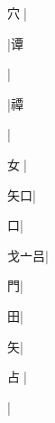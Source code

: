 \begin{multicols}{2}
{{\cjk{}{\cnsym{}　}穴{\cnxJzr{}}}\mktsJzrVerticalBar{}{\cjk{}{\cnsym{}　}{\cnsym{}　}{\cnsym{}　}}|{}\par
{}\mktsJzrVerticalBar{}{\cjk{}{\cnsym{}　}{\cnsym{}　}{\cnsym{}　}}|{\cjk{}谭}\par
{}\mktsJzrVerticalBar{}{\cjk{}{\cnsym{}　}{\cnsym{}　}{\cnsym{}　}}|{}\par
{}\mktsJzrVerticalBar{}{\cjk{}{\cnsym{}　}{\cnsym{}　}{\cnsym{}　}}|{\cjk{}禫}\par
{}\mktsJzrVerticalBar{}{\cjk{}{\cnsym{}　}{\cnsym{}　}{\cnsym{}　}}|{}\par
{\cjk{}{\cnsym{}　}女{\cnxJzr{}}}\mktsJzrVerticalBar{}{\cjk{}{\cnsym{}　}{\cnsym{}　}{\cnsym{}　}}|{}\par
{\cjk{}{\cnsym{}　}矢口}\mktsJzrVerticalBar{}{\cjk{}{\cnsym{}　}{\cnsym{}　}{\cnsym{}　}}|{}\par
{口}\mktsJzrVerticalBar{}{\cjk{}{\cnsym{}　}{\cnsym{}　}{\cnsym{}　}}|{}\par
{\cjk{}戈亠吕}|{}\par
{\cjk{}{\cnsym{}　}{\cnsym{}　}門}\mktsJzrVerticalBar{}{\cjk{}{\cnsym{}　}{\cnsym{}　}{\cnsym{}　}}|{}\par
{田}\mktsJzrVerticalBar{}{\cjk{}{\cnsym{}　}{\cnsym{}　}{\cnsym{}　}}|{}\par
{\cjk{}{\cnsym{}　}{\cnsym{}　}矢}\mktsJzrVerticalBar{}{\cjk{}{\cnsym{}　}{\cnsym{}　}{\cnsym{}　}}|{}\par
{占{\cnxb{}𠂭}}\mktsJzrVerticalBar{}{\cjk{}{\cnsym{}　}{\cnsym{}　}{\cnsym{}　}}|{}\par
{}\mktsJzrVerticalBar{}{\cjk{}{\cnsym{}　}{\cnsym{}　}{\cnsym{}　}}|{}\par
}
\end{multicols}
